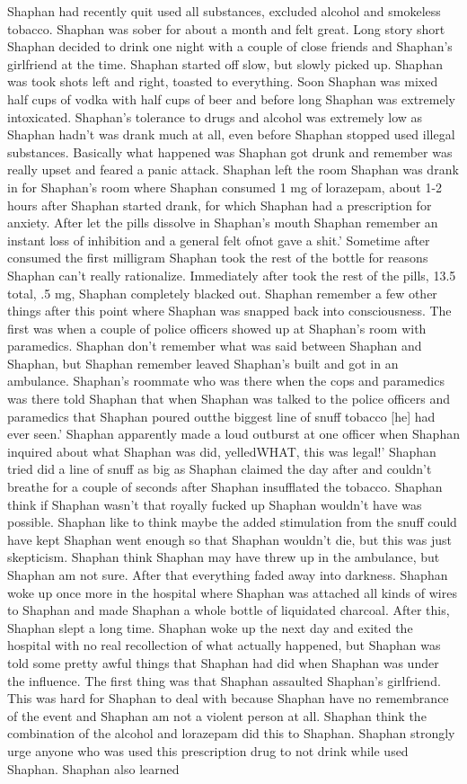 \documentclass[12pt]{book}
\begin{document}
Shaphan had recently quit used all substances, excluded alcohol and smokeless tobacco. Shaphan was sober for about a month and felt great. Long story short Shaphan decided to drink one night with a couple of close friends and Shaphan's girlfriend at the time. Shaphan started off slow, but slowly picked up. Shaphan was took shots left and right, toasted to everything. Soon Shaphan was mixed half cups of vodka with half cups of beer and before long Shaphan was extremely intoxicated. Shaphan's tolerance to drugs and alcohol was extremely low as Shaphan hadn't was drank much at all, even before Shaphan stopped used illegal substances. Basically what happened was Shaphan got drunk and remember was really upset and feared a panic attack. Shaphan left the room Shaphan was drank in for Shaphan's room where Shaphan consumed 1 mg of lorazepam, about 1-2 hours after Shaphan started drank, for which Shaphan had a prescription for anxiety. After let the pills dissolve in Shaphan's mouth Shaphan remember an instant loss of inhibition and a general felt ofnot gave a shit.' Sometime after consumed the first milligram Shaphan took the rest of the bottle for reasons Shaphan can't really rationalize. Immediately after took the rest of the pills, 13.5 total, .5 mg, Shaphan completely blacked out. Shaphan remember a few other things after this point where Shaphan was snapped back into consciousness. The first was when a couple of police officers showed up at Shaphan's room with paramedics. Shaphan don't remember what was said between Shaphan and Shaphan, but Shaphan remember leaved Shaphan's built and got in an ambulance. Shaphan's roommate who was there when the cops and paramedics was there told Shaphan that when Shaphan was talked to the police officers and paramedics that Shaphan poured outthe biggest line of snuff tobacco [he] had ever seen.' Shaphan apparently made a loud outburst at one officer when Shaphan inquired about what Shaphan was did, yelledWHAT, this was legal!' Shaphan tried did a line of snuff as big as Shaphan claimed the day after and couldn't breathe for a couple of seconds after Shaphan insufflated the tobacco. Shaphan think if Shaphan wasn't that royally fucked up Shaphan wouldn't have was possible. Shaphan like to think maybe the added stimulation from the snuff could have kept Shaphan went enough so that Shaphan wouldn't die, but this was just skepticism. Shaphan think Shaphan may have threw up in the ambulance, but Shaphan am not sure. After that everything faded away into darkness. Shaphan woke up once more in the hospital where Shaphan was attached all kinds of wires to Shaphan and made Shaphan a whole bottle of liquidated charcoal. After this, Shaphan slept a long time. Shaphan woke up the next day and exited the hospital with no real recollection of what actually happened, but Shaphan was told some pretty awful things that Shaphan had did when Shaphan was under the influence. The first thing was that Shaphan assaulted Shaphan's girlfriend. This was hard for Shaphan to deal with because Shaphan have no remembrance of the event and Shaphan am not a violent person at all. Shaphan think the combination of the alcohol and lorazepam did this to Shaphan. Shaphan strongly urge anyone who was used this prescription drug to not drink while used Shaphan. Shaphan also learned 
\end{document}

